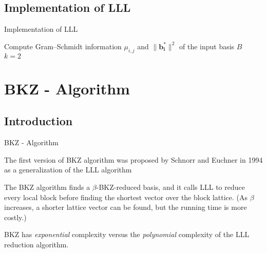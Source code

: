 \documentclass[aspectratio=169]{beamer}
\begin{document}
    \subsection{Implementation of LLL}

    \begin{frame}[fragile]{Implementation of LLL}
        \begin{algorithm}[H]
            \caption{LLL - Algorithm}
            \label{alg:LLL}

            \Input{A basis $\mathbf{B} = \{\mathbf{b_1, b_2, ..., b_n}\}$ of a lattice $L$, and a reduction parameter $\delta \in (0.25, 1]$}

            Compute Gram–Schmidt information $\mu_{i, j}$ and $\| \mathbf{b_i^*} \| ^ 2$ of the input basis $B$ \\
            $k = 2$ \\
        \end{algorithm}
    \end{frame}

    \section{BKZ - Algorithm}
    \subsection{Introduction}

    \begin{frame}{BKZ - Algorithm}

        The first version of BKZ algorithm was proposed by Schnorr and Euchner in 1994 as a generalization of the LLL algorithm

        \hfill

        The BKZ algorithm finds a $\beta$-BKZ-reduced basis, and it calls LLL to reduce every local block before finding the shortest vector over the block lattice. (As $\beta$ increases, a shorter lattice vector can be found, but the running time is more costly.)

        \hfill

        BKZ has \emph{exponential} complexity versus the \emph{polynomial} complexity of the LLL reduction algorithm.
    \end{frame}
\end{document}
